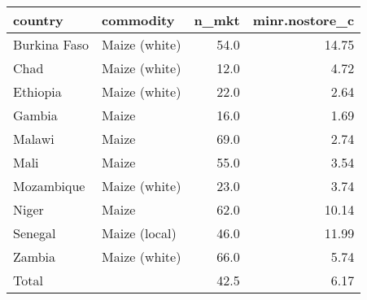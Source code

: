 \begin{table}[ht]
\centering
\begin{tabular}{llrr}
  \hline
country & commodity & n\_mkt & minr.nostore\_c \\ 
  \hline
Burkina Faso & Maize (white) & 54.0 & 14.75 \\ 
  Chad & Maize (white) & 12.0 & 4.72 \\ 
  Ethiopia & Maize (white) & 22.0 & 2.64 \\ 
  Gambia & Maize & 16.0 & 1.69 \\ 
  Malawi & Maize & 69.0 & 2.74 \\ 
  Mali & Maize & 55.0 & 3.54 \\ 
  Mozambique & Maize (white) & 23.0 & 3.74 \\ 
  Niger & Maize & 62.0 & 10.14 \\ 
  Senegal & Maize (local) & 46.0 & 11.99 \\ 
  Zambia & Maize (white) & 66.0 & 5.74 \\ 
  Total &  & 42.5 & 6.17 \\ 
   \hline
\end{tabular}
\end{table}
